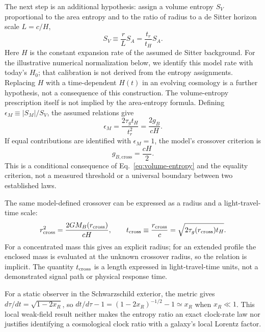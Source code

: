 \documentclass[12pt]{article}
\begin{document}
The next step is an additional hypothesis: assign a volume entropy $S_V$ proportional to the area entropy and to the ratio of radius to a de Sitter horizon scale $L=c/H$,
\begin{equation}
  S_V\equiv\frac{r}{L}S_A=\frac{t_r}{t_H}S_A.
  \label{eq:volume-entropy}
\end{equation}
Here $H$ is the constant expansion rate of the assumed de Sitter background. For the illustrative numerical normalization below, we identify this model rate with today's $H_0$; that calibration is not derived from the entropy assignments. Replacing $H$ with a time-dependent $H(t)$ in an evolving cosmology is a further hypothesis, not a consequence of this construction. The volume-entropy prescription itself is not implied by the area-entropy formula. Defining $\epsilon_M\equiv|S_M|/S_V$, the assumed relations give
\begin{equation}
  \epsilon_M
  =\frac{2\tau_g t_H}{t_r^2}
  =\frac{2g_B}{cH}.
  \label{eq:epsilon-m}
\end{equation}
If equal contributions are identified with $\epsilon_M=1$, the model's crossover criterion is
\begin{equation}
  g_{B,\mathrm{cross}}=\frac{cH}{2}.
  \label{eq:entropy-crossover}
\end{equation}
This is a conditional consequence of Eq.~\eqref{eq:volume-entropy} and the equality criterion, not a measured threshold or a universal boundary between two established laws.

The same model-defined crossover can be expressed as a radius and a light-travel-time scale:
\begin{equation}
  r_{\rm cross}^2=\frac{2G M_B(r_{\rm cross})}{cH},
  \qquad
  t_{\rm cross}\equiv\frac{r_{\rm cross}}{c}
  =\sqrt{2\tau_g(r_{\rm cross})t_H}.
  \label{eq:crossover-scales}
\end{equation}
For a concentrated mass this gives an explicit radius; for an extended profile the enclosed mass is evaluated at the unknown crossover radius, so the relation is implicit. The quantity $t_{\rm cross}$ is a length expressed in light-travel-time units, not a demonstrated signal path or physical response time.

For a static observer in the Schwarzschild exterior, the metric gives $d\tau/dt=\sqrt{1-2x_R}$, so $dt/d\tau-1=(1-2x_R)^{-1/2}-1\simeq x_R$ when $x_R\ll1$. This local weak-field result neither makes the entropy ratio an exact clock-rate law nor justifies identifying a cosmological clock ratio with a galaxy's local Lorentz factor.
\end{document}
